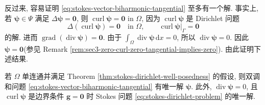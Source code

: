 反过来, 容易证明
\eqref{eq:stokes-vector-biharmonic-tangential} 至多有一个解.
事实上, 若 $\boldsymbol{\psi}\in\Psi$ 满足
$\Delta\boldsymbol{\psi}=\mathbf{0}$,
则 $\operatorname{curl}\boldsymbol{\psi}=\mathbf{0}$ in $\Omega$,
因为 $\operatorname{curl}\boldsymbol{\psi}$ 是 Dirichlet 问题
\[
\Delta(\operatorname{curl}\boldsymbol{\psi})=\mathbf{0}
\quad\text{in }\Omega,
\qquad
\operatorname{curl}\boldsymbol{\psi}|_\Gamma=\mathbf{0}
\]
的解. 进而
$\operatorname{grad}(\operatorname{div}\boldsymbol{\psi})=\mathbf{0}$.
由于
$\int_\Omega\operatorname{div}\boldsymbol{\psi}\,\mathrm{d}x=0$,
所以 $\operatorname{div}\boldsymbol{\psi}=0$.
因此 $\boldsymbol{\psi}=\mathbf{0}$(参见 Remark
\ref{rem:sec3-zero-curl-zero-tangential-implies-zero}). 由此证明下述结果.

\setcounter{statement}{0}
\begin{Lemma}\label{lem:stokes-vector-biharmonic-tangential}
若 $\Omega$ 单连通并满足 Theorem
\ref{thm:stokes-dirichlet-well-posedness} 的假设, 则双调和问题
\eqref{eq:stokes-vector-biharmonic-tangential} 有唯一解
$\boldsymbol{\psi}$. 此外,
$\operatorname{div}\boldsymbol{\psi}=0$, 且
$\operatorname{curl}\boldsymbol{\psi}$ 是边界条件
$\mathbf{g}=\mathbf{0}$ 时 Stokes 问题
\eqref{eq:stokes-dirichlet-problem} 的唯一解.
\end{Lemma}
